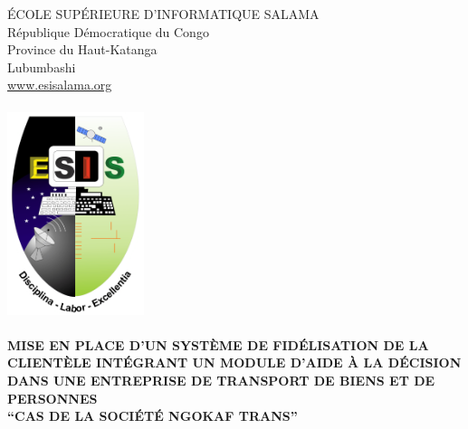 \begin{titlepage} %
	\center %
	
	
	{\large ÉCOLE SUPÉRIEURE D’INFORMATIQUE SALAMA}\\ %
	
	{\large République Démocratique du Congo}\\ %
	
	{\large Province du Haut-Katanga}\\ %
	
	{\large Lubumbashi}\\ %
	
	{\large \href{www.esisalama.org}{www.esisalama.org}}\\[0.25cm] %
	
	\HHRule\\[1cm]

    \includegraphics[width=40mm]{images/logoesis.png}\\[0.5cm]

	
	\HRule\\[0.4cm]
	
	\textbf{MISE EN PLACE D’UN SYSTÈME DE FIDÉLISATION DE LA CLIENTÈLE
	INTÉGRANT UN MODULE D’AIDE À LA DÉCISION DANS UNE ENTREPRISE DE TRANSPORT
	DE BIENS ET DE PERSONNES\\\enquote{CAS DE LA SOCIÉTÉ NGOKAF TRANS}}
	

\end{titlepage}
